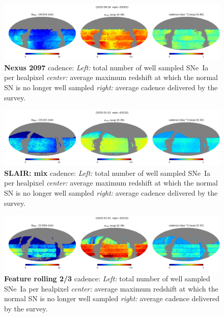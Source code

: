 \begin{figure}[h!]
  \begin{center}
    \includegraphics[width=\linewidth]{Figures/nexus_2097_64_maps.png}
    \caption{{\bf Nexus 2097} cadence: {\em Left:} total number of well
      sampled SNe~Ia per healpixel {\em center:} average maximum
      redshift at which the normal SN is no longer well sampled {\em
        right:} average cadence delivered by the survey.}
    \label{fig:nexus_2097}
  \end{center}
\end{figure}

\begin{figure}[h!]
  \begin{center}
    \includegraphics[width=\linewidth]{Figures/cadence_mix_10yrs_64_maps.png}
    \caption{{\bf SLAIR: mix} cadence: {\em Left:} total number of well
      sampled SNe~Ia per healpixel {\em center:} average maximum
      redshift at which the normal SN is no longer well sampled {\em
        right:} average cadence delivered by the survey.}
    \label{fig:cadence_mix}
  \end{center}
\end{figure}

\begin{figure}[h!]
  \begin{center}
    \includegraphics[width=\linewidth]{Figures/feature_rolling_twoThird_10yrs_64_maps.png}
    \caption{{\bf Feature rolling 2/3} cadence: {\em Left:} total number of well
      sampled SNe~Ia per healpixel {\em center:} average maximum
      redshift at which the normal SN is no longer well sampled {\em
        right:} average cadence delivered by the survey.}
    \label{fig:feature_rolling_two_third}
  \end{center}
\end{figure}

